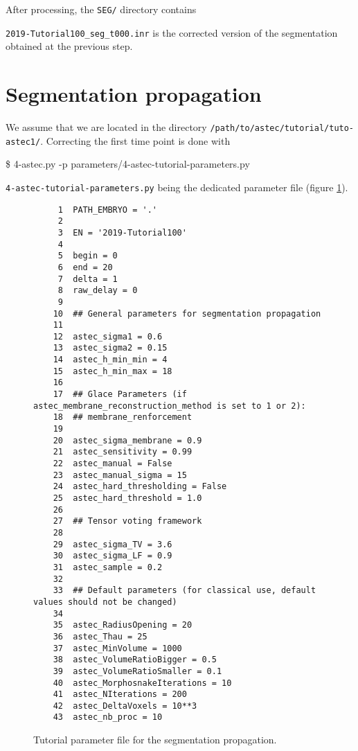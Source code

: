 After processing, the \texttt{SEG/} directory contains

\mbox{}
\mbox{}

\texttt{2019-Tutorial100\_seg\_t000.inr} is the corrected version of
the segmentation obtained at the previous step.



\section{Segmentation propagation}
\label{sec:tutorial:segmentation:propagation}

We assume that we are located in the directory
\texttt{/path/to/astec/tutorial/tuto-astec1/}. Correcting the first
time point is
done with
\begin{code}{0.8}
  \$ 4-astec.py -p parameters/4-astec-tutorial-parameters.py  
\end{code}
\texttt{4-astec-tutorial-parameters.py} being the
dedicated parameter file  (figure \ref{fig:tutorial:parameter:astec}).

\begin{figure}
\begin{framed}
\begin{verbatim}
     1	PATH_EMBRYO = '.'
     2	
     3	EN = '2019-Tutorial100'
     4	
     5	begin = 0
     6	end = 20
     7	delta = 1
     8	raw_delay = 0
     9	
    10	## General parameters for segmentation propagation
    11	
    12	astec_sigma1 = 0.6  		
    13	astec_sigma2 = 0.15 		
    14	astec_h_min_min = 4
    15	astec_h_min_max = 18   		
    16	
    17	## Glace Parameters (if astec_membrane_reconstruction_method is set to 1 or 2):
    18	## membrane_renforcement
    19	
    20	astec_sigma_membrane = 0.9
    21	astec_sensitivity = 0.99  
    22	astec_manual = False     	
    23	astec_manual_sigma = 15   
    24	astec_hard_thresholding = False 
    25	astec_hard_threshold = 1.0      
    26	
    27	## Tensor voting framework
    28	
    29	astec_sigma_TV = 3.6    
    30	astec_sigma_LF = 0.9    
    31	astec_sample = 0.2      
    32	
    33	## Default parameters (for classical use, default values should not be changed)
    34	
    35	astec_RadiusOpening = 20 		
    36	astec_Thau = 25 				
    37	astec_MinVolume = 1000 		
    38	astec_VolumeRatioBigger = 0.5 
    39	astec_VolumeRatioSmaller = 0.1
    40	astec_MorphosnakeIterations = 10 
    41	astec_NIterations = 200 		
    42	astec_DeltaVoxels = 10**3  	
    43	astec_nb_proc = 10
\end{verbatim}
\end{framed}
\caption{\label{fig:tutorial:parameter:astec} Tutorial
  parameter file for the segmentation propagation.}
\end{figure}


